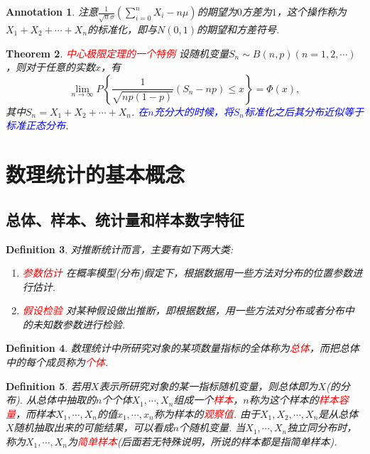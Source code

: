 \documentclass{article}
\newtheorem{theorem}{Theorem}[section]
\newtheorem{definition}[theorem]{Definition}
\newtheorem{annotation}[theorem]{Annotation}
\newcommand{\redt}[1]{\textcolor{red}{#1}}
\newcommand{\bluet}[1]{\textcolor{blue}{#1}}
\begin{document}
\begin{annotation}
\rm 注意$\frac{1}{\sqrt{n}\sigma}(\sum\limits_{i=0}^nX_i - n\mu)$的期望为$0$方差为$1$，这个操作称为$X_1 + X_2 +\cdots + X_n$的标准化，即与$N(0,1)$的期望和方差符号. 
\end{annotation}

\begin{theorem}
\rm \redt{中心极限定理的一个特例} 设随机变量$S_n \sim B(n,p)(n=1,2,\cdots)$，则对于任意的实数$x$，有
$$
\lim\limits_{n \rightarrow \infty}P\left\{\frac{1}{\sqrt{np(1-p)}}(S_n - np) \leq x\right\} = \Phi(x),
$$
其中$S_n = X_1+X_2+\cdots + X_n$. \bluet{在$n$充分大的时候，将$S_n$标准化之后其分布近似等于标准正态分布}. 
\end{theorem}


\newpage
\section{数理统计的基本概念}

\subsection{总体、样本、统计量和样本数字特征}

\begin{definition}
\rm 对推断统计而言，主要有如下两大类:
\begin{enumerate}
	\item \redt{参数估计} 在概率模型(分布)假定下，根据数据用一些方法对分布的位置参数进行估计. 
	\item \redt{假设检验} 对某种假设做出推断，即根据数据，用一些方法对分布或者分布中的未知数参数进行检验. 
\end{enumerate}
\end{definition}

\begin{definition}
\rm 数理统计中所研究对象的某项数量指标的全体称为\redt{总体}，而把总体中的每个成员称为\redt{个体}.
\end{definition}

\begin{definition}
\rm 若用$X$表示所研究对象的某一指标随机变量，则总体即为$X$(的分布). 从总体中抽取的$n$个个体$X_1,\cdots,X_n$组成一个\redt{样本}，$n$称为这个样本的\redt{样本容量}，而样本$X_1,\cdots,X_n$的值$x_1,\cdots,x_n$称为样本的\redt{观察值}. 由于$X_1,X_2,\cdots,X_n$是从总体$X$随机抽取出来的可能结果，可以看成$n$个随机变量. 当$X_1,\cdots,X_n$独立同分布时，称为$X_1,\cdots,X_n$为\redt{简单样本}(后面若无特殊说明，所说的样本都是指简单样本).
\end{definition}
\end{document}

